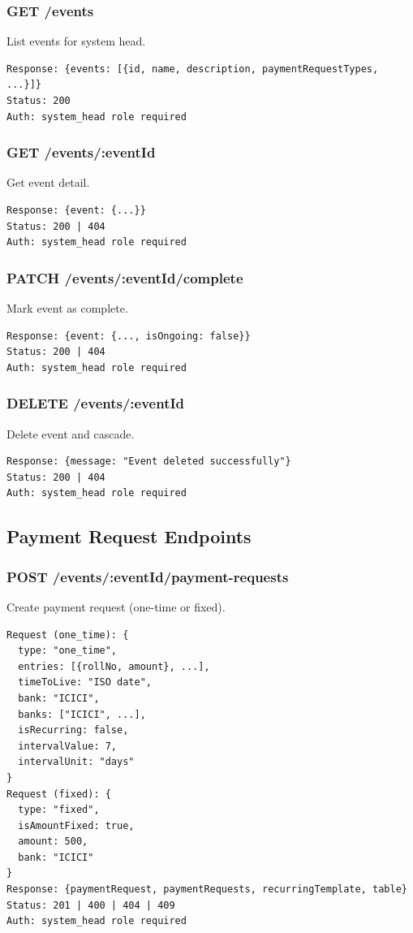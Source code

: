 \documentclass[12pt,a4paper]{article}
\begin{document}
\subsubsection{GET /events}
List events for system head.
\begin{lstlisting}
Response: {events: [{id, name, description, paymentRequestTypes, ...}]}
Status: 200
Auth: system_head role required
\end{lstlisting}

\subsubsection{GET /events/:eventId}
Get event detail.
\begin{lstlisting}
Response: {event: {...}}
Status: 200 | 404
Auth: system_head role required
\end{lstlisting}

\subsubsection{PATCH /events/:eventId/complete}
Mark event as complete.
\begin{lstlisting}
Response: {event: {..., isOngoing: false}}
Status: 200 | 404
Auth: system_head role required
\end{lstlisting}

\subsubsection{DELETE /events/:eventId}
Delete event and cascade.
\begin{lstlisting}
Response: {message: "Event deleted successfully"}
Status: 200 | 404
Auth: system_head role required
\end{lstlisting}

\subsection{Payment Request Endpoints}

\subsubsection{POST /events/:eventId/payment-requests}
Create payment request (one-time or fixed).
\begin{lstlisting}
Request (one_time): {
  type: "one_time",
  entries: [{rollNo, amount}, ...],
  timeToLive: "ISO date",
  bank: "ICICI",
  banks: ["ICICI", ...],
  isRecurring: false,
  intervalValue: 7,
  intervalUnit: "days"
}
Request (fixed): {
  type: "fixed",
  isAmountFixed: true,
  amount: 500,
  bank: "ICICI"
}
Response: {paymentRequest, paymentRequests, recurringTemplate, table}
Status: 201 | 400 | 404 | 409
Auth: system_head role required
\end{lstlisting}
\end{document}
